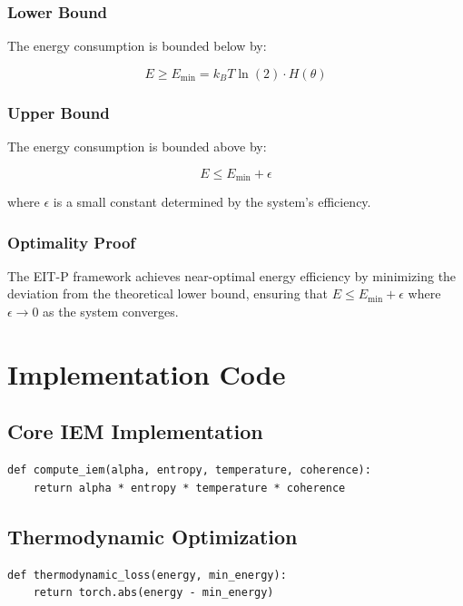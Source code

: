\documentclass[12pt]{article}
\begin{document}
\subsubsection{Lower Bound}

The energy consumption is bounded below by:

\begin{equation}
E \geq E_{\min} = k_B T \ln(2) \cdot H(\theta)
\end{equation}

\subsubsection{Upper Bound}

The energy consumption is bounded above by:

\begin{equation}
E \leq E_{\min} + \epsilon
\end{equation}

where $\epsilon$ is a small constant determined by the system's efficiency.

\subsubsection{Optimality Proof}

The EIT-P framework achieves near-optimal energy efficiency by minimizing the deviation from the theoretical lower bound, ensuring that $E \leq E_{\min} + \epsilon$ where $\epsilon \to 0$ as the system converges.

\section{Implementation Code}

\subsection{Core IEM Implementation}

\begin{verbatim}
def compute_iem(alpha, entropy, temperature, coherence):
    return alpha * entropy * temperature * coherence
\end{verbatim}

\subsection{Thermodynamic Optimization}

\begin{verbatim}
def thermodynamic_loss(energy, min_energy):
    return torch.abs(energy - min_energy)
\end{verbatim}
\end{document}
